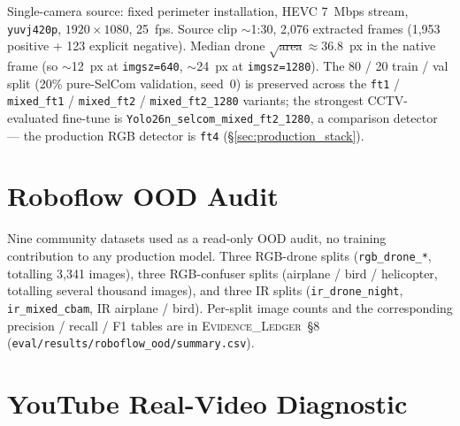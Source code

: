 \documentclass[12pt,a4paper,oneside,openright]{book}
\begin{document}
Single-camera source: fixed perimeter installation, HEVC 7~Mbps stream, \texttt{yuvj420p}, $1920{\times}1080$, 25~fps. Source clip $\sim$1:30, 2{,}076 extracted frames (1{,}953 positive + 123 explicit negative). Median drone $\sqrt{\text{area}} \approx 36.8$~px in the native frame (so $\sim$12~px at \texttt{imgsz=640}, $\sim$24~px at \texttt{imgsz=1280}). The 80 / 20 train / val split (20\% pure-SelCom validation, seed~0) is preserved across the \texttt{ft1} / \texttt{mixed\_ft1} / \texttt{mixed\_ft2} / \texttt{mixed\_ft2\_1280} variants; the strongest CCTV-evaluated fine-tune is \texttt{Yolo26n\_selcom\_mixed\_ft2\_1280}, a comparison detector --- the production RGB detector is \texttt{ft4} (\S\ref{sec:production_stack}).

\section{Roboflow OOD Audit}

Nine community datasets used as a read-only OOD audit, no training contribution to any production model. Three RGB-drone splits (\texttt{rgb\_drone\_*}, totalling 3{,}341 images), three RGB-confuser splits (airplane / bird / helicopter, totalling several thousand images), and three IR splits (\texttt{ir\_drone\_night}, \texttt{ir\_mixed\_cbam}, IR airplane / bird). Per-split image counts and the corresponding precision / recall / F1 tables are in \textsc{Evidence\_Ledger}~\S8 (\texttt{eval/results/roboflow\_ood/summary.csv}).

\section{YouTube Real-Video Diagnostic}
\end{document}
